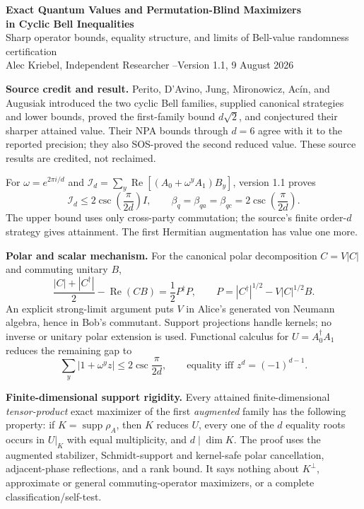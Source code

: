 \documentclass[11pt]{article}
\newcommand{\Reop}{\operatorname{Re}}
\newcommand{\supp}{\operatorname{supp}}
\begin{document}
\begin{center}
{\Large\bfseries Exact Quantum Values and Permutation-Blind Maximizers\\
in Cyclic Bell Inequalities}\\[-1pt]
{\small Sharp operator bounds, equality structure, and limits of Bell-value
randomness certification}\\[3pt]
{\small Alec Kriebel, Independent Researcher \quad--\quad Version 1.1,
9 August 2026}
\end{center}

\textbf{Source credit and result.}
Perito, D'Avino, Jung,
Mironowicz, Ac\'in, and Augusiak introduced the two cyclic Bell families,
supplied canonical strategies and lower bounds, proved the first-family bound
$d\sqrt2$, and conjectured their sharper attained value. Their NPA bounds
through $d=6$ agree with it to the reported precision; they also SOS-proved
the second reduced value. These source results are credited, not reclaimed.

For $\omega=e^{2\pi i/d}$ and
$\mathcal I_d=\sum_y\Reop[(A_0+\omega^yA_1)B_y]$, version 1.1 proves
\[
 \mathcal I_d\le 2\csc\!\left(\frac{\pi}{2d}\right)I,
 \qquad
 \beta_q=\beta_{qa}=\beta_{qc}=2\csc\!\left(\frac{\pi}{2d}\right).
\]
The upper bound uses only cross-party commutation; the source's finite
order-$d$ strategy gives attainment. The first Hermitian augmentation has
value one more.

\textbf{Polar and scalar mechanism.}
For the canonical polar decomposition $C=V|C|$ and commuting unitary $B$,
\[
 \frac{|C|+|C^\dagger|}{2}-\Reop(CB)
 =\frac12P^\dagger P,
 \qquad P=|C^\dagger|^{1/2}-V|C|^{1/2}B.
\]
An explicit strong-limit argument puts $V$ in Alice's generated von Neumann
algebra, hence in Bob's commutant. Support projections handle kernels; no
inverse or unitary polar extension is used. Functional calculus for
$U=A_0^\dagger A_1$ reduces the remaining gap to
\[
 \sum_y|1+\omega^yz|\le2\csc\frac{\pi}{2d},
 \qquad\text{equality iff }z^d=(-1)^{d-1}.
\]

\textbf{Finite-dimensional support rigidity.}
Every attained finite-dimensional \emph{tensor-product} exact maximizer of the
first \emph{augmented} family has the following property: if
$K=\supp\rho_A$, then $K$ reduces $U$, every one of the $d$ equality roots
occurs in $U|_K$ with equal multiplicity, and $d\mid\dim K$. The proof uses
the augmented stabilizer, Schmidt-support and kernel-safe polar cancellation,
adjacent-phase reflections, and a rank bound.
It says nothing about $K^\perp$, approximate or general commuting-operator
maximizers, or a complete classification/self-test.
\end{document}
